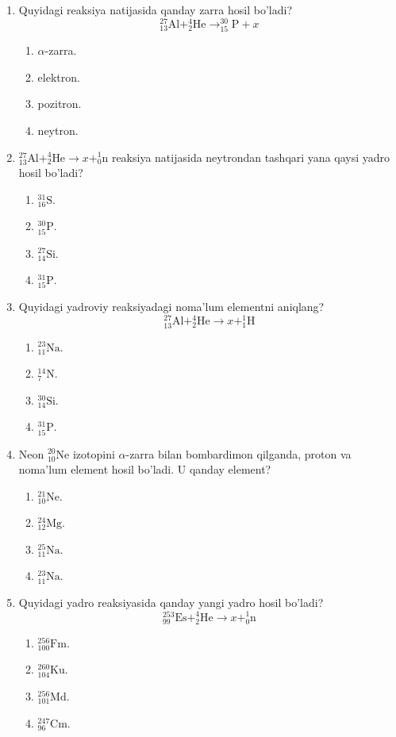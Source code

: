 \begin{enumerate}
\item Quyidagi reaksiya natijasida qanday zarra hosil bo'ladi?
$$^{27}_{13}\text{Al} + ^4_2\text{He} \rightarrow ^{30}_{15}\text{P} + x$$
\begin{enumerate}[label=\Alph*)]
\item $\alpha$-zarra.
\item elektron.
\item pozitron.
\item neytron.
\end{enumerate}

\item $^{27}_{13}\text{Al} + ^4_2\text{He} \rightarrow x + ^1_0\text{n}$ reaksiya natijasida neytrondan tashqari yana qaysi yadro hosil bo'ladi?
\begin{enumerate}[label=\Alph*)]
\item $^{31}_{16}\text{S}$.
\item $^{30}_{15}\text{P}$.
\item $^{27}_{14}\text{Si}$.
\item $^{31}_{15}\text{P}$.
\end{enumerate}

\item Quyidagi yadroviy reaksiyadagi noma'lum elementni aniqlang?
$$^{27}_{13}\text{Al} + ^4_2\text{He} \rightarrow x + ^1_1\text{H}$$
\begin{enumerate}[label=\Alph*)]
\item $^{23}_{11}\text{Na}$.
\item $^{14}_{7}\text{N}$.
\item $^{30}_{14}\text{Si}$.
\item $^{31}_{15}\text{P}$.
\end{enumerate}

\item Neon $^{20}_{10}\text{Ne}$ izotopini $\alpha$-zarra bilan bombardimon qilganda, proton va noma'lum element hosil bo'ladi. U qanday element?
\begin{enumerate}[label=\Alph*)]
\item $^{21}_{10}\text{Ne}$.
\item $^{24}_{12}\text{Mg}$.
\item $^{25}_{11}\text{Na}$.
\item $^{23}_{11}\text{Na}$.
\end{enumerate}

\item Quyidagi yadro reaksiyasida qanday yangi yadro hosil bo'ladi?
$$^{253}_{99}\text{Es} + ^4_2\text{He} \rightarrow x + ^1_0\text{n}$$
\begin{enumerate}[label=\Alph*)]
\item $^{256}_{100}\text{Fm}$.
\item $^{260}_{104}\text{Ku}$.
\item $^{256}_{101}\text{Md}$.
\item $^{247}_{96}\text{Cm}$.
\end{enumerate}


\end{enumerate}
